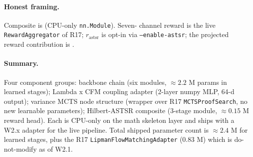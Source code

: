 \paragraph{Honest framing.}
Composite is \DESIGN{} (CPU-only \texttt{nn.Module}).  Seven-
channel reward is the live \texttt{RewardAggregator} of R17;
$r_{\mathrm{astsr}}$ is opt-in via \texttt{--enable-astsr}; the
projected reward contribution is \PROJECTED{}.

\paragraph{Summary.}
Four component groups: backbone chain (six modules, $\approx 2.2$
M params in learned stages); Lambda x CFM coupling adapter (2-layer
numpy MLP, 64-d output); variance MCTS node structure (wrapper over
R17 \texttt{MCTSProofSearch}, no new learnable parameters);
Hilbert-ASTSR composite (3-stage module, $\approx 0.15$ M reward
head).  Each is CPU-only on the math skeleton layer and ships with
a W2.x adapter for the live pipeline.  Total shipped parameter
count is $\approx 2.4$ M for learned stages, plus the R17
\texttt{LipmanFlowMatchingAdapter} ($0.83$ M) which is
do-not-modify as of W2.1.

\endinput
